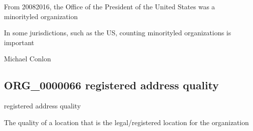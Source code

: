 \documentclass[letterpaper,10pt,english]{sphinxmanual}
\begin{document}
\begin{sphinxShadowBox}

\sphinxAtStartPar
From 2008\sphinxhyphen{}2016, the Office of the President of the United States was a minority\sphinxhyphen{}led organization
\end{sphinxShadowBox}

\begin{sphinxShadowBox}

\sphinxAtStartPar
In some jurisdictions, such as the US, counting minority\sphinxhyphen{}led organizations is important
\end{sphinxShadowBox}

\begin{sphinxShadowBox}

\sphinxAtStartPar
Michael Conlon 
\end{sphinxShadowBox}
\begin{quote}

\ignorespaces \end{quote}


\subsection{ORG\_0000066 \sphinxhyphen{} registered address quality}
\label{\detokenize{doc-ORG_0000066:org-0000066-registered-address-quality}}\label{\detokenize{doc-ORG_0000066:index-0}}\label{\detokenize{doc-ORG_0000066::doc}}
\begin{sphinxShadowBox}

\sphinxAtStartPar
registered address quality
\end{sphinxShadowBox}

\begin{sphinxShadowBox}

\sphinxAtStartPar
{\hyperref[\detokenize{doc-BFO_0000019::doc}]{}}
\end{sphinxShadowBox}

\begin{sphinxShadowBox}

\sphinxAtStartPar
The quality of a location that is the legal/registered location for the organization
\end{sphinxShadowBox}
\end{document}
